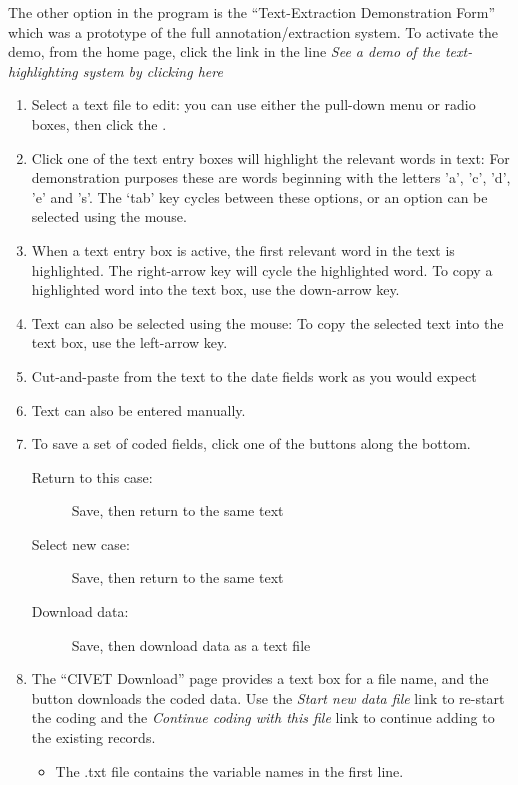 \documentclass[letterpaper,10pt,english]{sphinxmanual}
\begin{document}
The other option in the program is the “Text-Extraction Demonstration
Form” which was a prototype of the full annotation/extraction system. To
activate the demo, from the home page, click the link in the line \emph{See a
demo of the text-highlighting system by clicking here}
\begin{enumerate}
\item {} 
Select a text file to edit: you can use either the pull-down menu or
radio boxes, then click the .

\item {} 
Click one of the text entry boxes will highlight the relevant words
in text: For demonstration purposes these are words beginning with
the letters ’a’, ’c’, ’d’, ’e’ and ’s’. The ‘tab’ key cycles between
these options, or an option can be selected using the mouse.

\item {} 
When a text entry box is active, the first relevant word in the text
is highlighted. The right-arrow key will cycle the highlighted word.
To copy a highlighted word into the text box, use the down-arrow key.

\item {} 
Text can also be selected using the mouse: To copy the selected text
into the text box, use the left-arrow key.

\item {} 
Cut-and-paste from the text to the date fields work as you would
expect

\item {} 
Text can also be entered manually.

\item {} 
To save a set of coded fields, click one of the buttons along the
bottom.
\begin{description}
\item[{Return to this case:}] \leavevmode
Save, then return to the same text

\item[{Select new case:}] \leavevmode
Save, then return to the same text

\item[{Download data:}] \leavevmode
Save, then download data as a text file

\end{description}

\item {} 
The ``CIVET Download'' page provides a text box for a file name, and
the  button downloads the coded data. Use the \emph{Start
new data file} link to re-start the coding and the \emph{Continue coding
with this file} link to continue adding to the existing records.
\begin{itemize}
\item {} 
The .txt file contains the variable names in the first line.


\end{itemize}
\end{enumerate}
\end{document}
